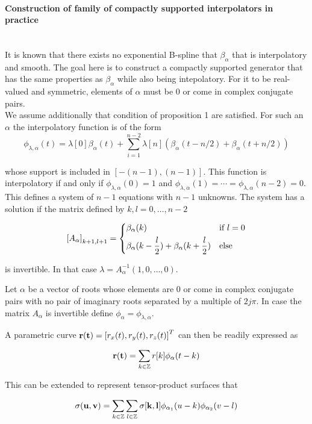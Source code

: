 \documentclass[a4paper, 11pt]{article}
\begin{document}
\paragraph{Construction of family of compactly supported interpolators in practice} \mbox{} \\

It is known that there exists no exponential B-spline that $\beta_{\alpha}$ that is interpolatory and smooth. The goal 
here is to construct a compactly supported generator that has the same properties as $\beta_{\alpha}$ while also being 
intepolatory. For it to be real-valued and symmetric, elements of $\alpha$ must be 0 or come in complex conjugate pairs.  
\\

We assume additionally that condition of proposition 1 are satisfied. For such an $\alpha$ the interpolatory function 
is of the form
\begin{equation}
  \phi_{\lambda, \alpha}(t) = \lambda[0]\beta_{\alpha}(t) + \sum_{i=1}^{n-2} \lambda[n](\beta_{\alpha}(t-n/2) + 
\beta_{\alpha}(t+n/2)) \end{equation}

whose support is included in $[-(n-1), (n-1)]$. This function is interpolatory if and only if $\phi_{\lambda, 
\alpha}(0)=1$ and $\phi_{\lambda, \alpha}(1)=\cdots=\phi_{\lambda, \alpha}(n-2)=0$. This defines a system of $n-1$ 
equations with $n-1$ unknowns. The system has a solution if the matrix defined by $k,l = 0, \ldots, n-2$

\begin{equation}
  {[A_{\alpha}]}_{k+1, l+1} = \begin{dcases}
    \beta_{\alpha}(k) &\text{if } l=0 \\
    \beta_{\alpha}(k-\frac{l}{2}) + \beta_{\alpha}(k+\frac{l}{2})  &\text{else }      
  \end{dcases}
\end{equation}

is invertible. In that case $\lambda = A_{\alpha}^{-1}(1, 0, \ldots, 0)$.

\begin{deftn}{3}
  Let $\alpha$ be a vector of roots whose elements are 0 or come in complex conjugate pairs with no pair of imaginary 
  roots separated by a multiple of $2j\pi$. In case the matrix $A_{\alpha}$ is invertible define $\phi_{\alpha} = 
  \phi_{\lambda, \alpha}$.  
\end{deftn}

A parametric curve ${\bf r(t)} = {[r_x(t), r_y(t), r_z(t)]}^T$ can then be readily expressed as

\begin{equation}
  {\bf r(t)} = \sum_{k \in \mathbb{Z}} r[k] \phi_{\alpha}(t-k)
\end{equation}

This can be extended to represent tensor-product surfaces that

\begin{equation}
  {\bf \sigma(u, v)} = \sum_{k \in \mathbb{Z}}\sum_{l \in \mathbb{Z}} {\bf \sigma[k,l]} \phi_{\alpha_1}(u-k) 
  \phi_{\alpha_2}(v-l)
\end{equation}
\end{document}
